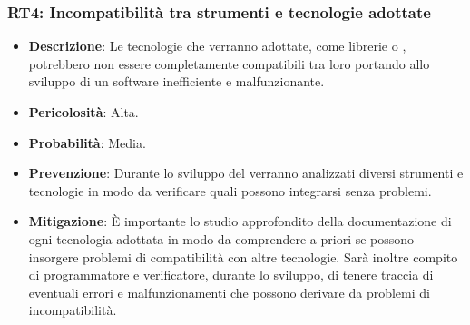 \subsubsection{RT4: Incompatibilità tra strumenti e tecnologie adottate}
\begin{itemize}
    \item \textbf{Descrizione}: Le tecnologie che verranno adottate, come librerie o , potrebbero non essere completamente compatibili tra loro portando allo sviluppo di un software inefficiente e malfunzionante.
    \item \textbf{Pericolosità}: Alta.
    \item \textbf{Probabilità}: Media.
    \item \textbf{Prevenzione}: Durante lo sviluppo del  verranno analizzati diversi strumenti e tecnologie in modo da verificare quali possono integrarsi senza problemi.
    \item \textbf{Mitigazione}: È importante lo studio approfondito della documentazione di ogni tecnologia adottata in modo da comprendere a priori se possono insorgere problemi di compatibilità con altre tecnologie.
    Sarà inoltre compito di programmatore e verificatore, durante lo sviluppo, di tenere traccia di eventuali errori e malfunzionamenti che possono derivare da problemi di incompatibilità.
\end{itemize}